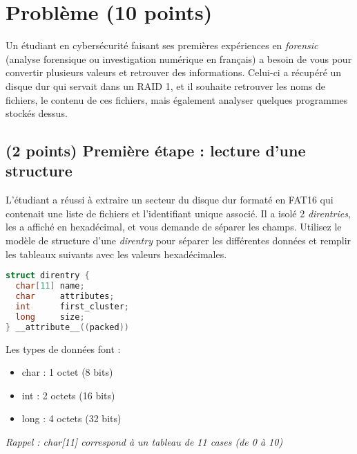 \documentclass[11pt,a4paper]{article}
\begin{document}
\section{Problème (10 points)}


Un étudiant en cybersécurité faisant ses premières expériences en \textit{forensic} (analyse forensique ou investigation numérique en français) a besoin de vous pour convertir plusieurs valeurs et retrouver des informations.
Celui-ci a récupéré un disque dur qui servait dans un RAID 1, et il souhaite retrouver les noms de fichiers, le contenu de ces fichiers, mais également analyser quelques programmes stockés dessus.

\bigskip

\subsection{(2 points) Première étape : lecture d'une structure }

L'étudiant a réussi à extraire un secteur du disque dur formaté en FAT16 qui contenait une liste de fichiers et l'identifiant unique associé.
Il a isolé 2 \textit{direntries}, les a affiché en hexadécimal, et vous demande de séparer les champs.
Utilisez le modèle de structure d'une \textit{direntry} pour séparer les différentes données et remplir les tableaux suivants avec les valeurs hexadécimales.

\newpage

\begin{table}[ht!]
  \centering
  \begin{minipage}{0.45\textwidth}
    \centering
\begin{lstlisting}[language=C]
struct direntry {
  char[11] name;
  char     attributes;
  int      first_cluster;
  long     size;
} __attribute__((packed)) \end{lstlisting}
  \end{minipage}
  \hfillx
  \begin{minipage}{0.45\textwidth}
Les types de données font :

\begin{itemize}
\item char : 1 octet (8 bits)
\item int : 2 octets (16 bits)
\item long : 4 octets (32 bits)
\end{itemize}

\textit{Rappel : char[11] correspond à un tableau de 11 cases (de 0 à 10)}
  \end{minipage}
\end{table}
\end{document}

